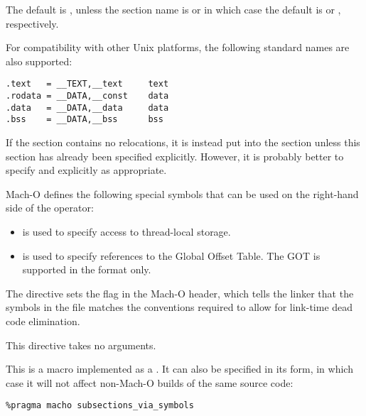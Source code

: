 The default is , unless the section name is  or
 in which case the default is  or ,
respectively.

For compatibility with other Unix platforms, the following standard
names are also supported:

\begin{lstlisting}
.text   = __TEXT,__text     text
.rodata = __DATA,__const    data
.data   = __DATA,__data     data
.bss    = __DATA,__bss      bss
\end{lstlisting}

If the  section contains no relocations, it is instead put
into the  section unless this section has already
been specified explicitly. However, it is probably better to specify
 and  explicitly as appropriate.


Mach-O defines the following special symbols that can be used on the
right-hand side of the  operator:

\begin{itemize}
    \item{ is used to specify access to thread-local storage.}
    \item{ is used to specify references to the Global Offset Table.
        The GOT is supported in the  format only.}
\end{itemize}


The directive  sets the
 flag in the Mach-O header, which tells
the linker that the symbols in the file matches the conventions
required to allow for link-time dead code elimination.

This directive takes no arguments.

This is a macro implemented as a . It can also be
specified in its  form, in which case it will not affect
non-Mach-O builds of the same source code:

\begin{lstlisting}
%pragma macho subsections_via_symbols
\end{lstlisting}

